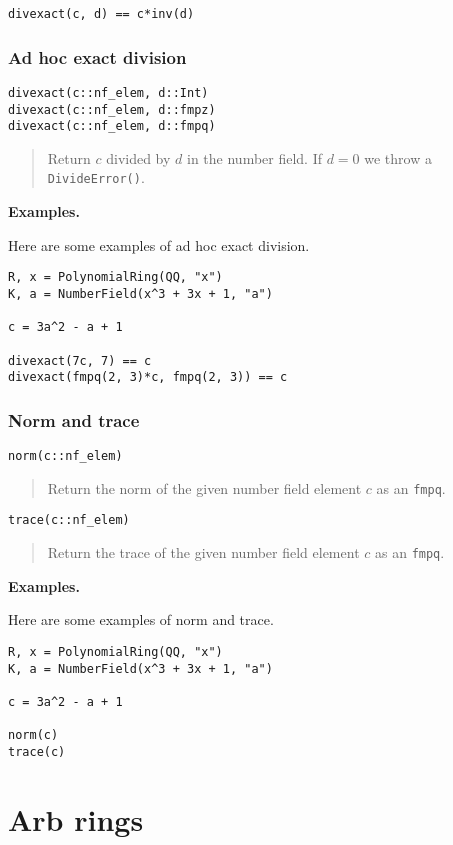 \documentclass[a4paper,10pt]{article}
\newcommand{\code}{\lstinline}
\newcommand{\desc}[1]{\vspace{-3mm}\begin{quote}#1\end{quote}}
\begin{document}
{{\begin{lstlisting}
divexact(c, d) == c*inv(d)
\end{lstlisting}

\subsubsection{Ad hoc exact division}

\begin{lstlisting}
divexact(c::nf_elem, d::Int)
divexact(c::nf_elem, d::fmpz)
divexact(c::nf_elem, d::fmpq)
\end{lstlisting}

\desc{Return $c$ divided by $d$ in the number field. If $d = 0$ we
throw a \code{DivideError()}.}

\textbf{Examples.}

Here are some examples of ad hoc exact division.

\begin{lstlisting}
R, x = PolynomialRing(QQ, "x")
K, a = NumberField(x^3 + 3x + 1, "a")

c = 3a^2 - a + 1

divexact(7c, 7) == c
divexact(fmpq(2, 3)*c, fmpq(2, 3)) == c
\end{lstlisting}

\subsubsection{Norm and trace}

\begin{lstlisting}
norm(c::nf_elem)
\end{lstlisting}

\desc{Return the norm of the given number field element $c$ as an \code{fmpq}.}

\begin{lstlisting}
trace(c::nf_elem)
\end{lstlisting}

\desc{Return the trace of the given number field element $c$ as an \code{fmpq}.}

\textbf{Examples.}

Here are some examples of norm and trace.

\begin{lstlisting}
R, x = PolynomialRing(QQ, "x")
K, a = NumberField(x^3 + 3x + 1, "a")

c = 3a^2 - a + 1

norm(c)
trace(c)
\end{lstlisting}

\section{Arb rings}

}}
\end{document}
